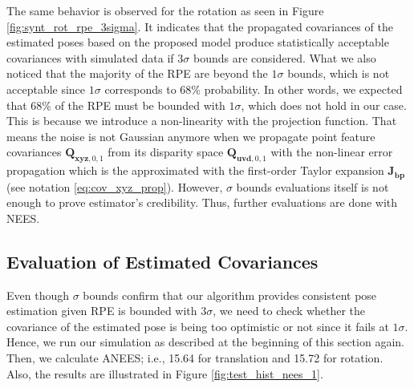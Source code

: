 \documentclass[a4paper]{report}
\numberwithin{figure}{section}
\begin{document}
The same behavior is observed for the rotation as seen in Figure 
\ref{fig:synt_rot_rpe_3sigma}. It indicates that the propagated covariances of 
the estimated poses based on the proposed model produce statistically 
acceptable covariances with simulated data if $3\sigma$ bounds are 
considered.  What we also noticed that the majority of the RPE are beyond the 
$1\sigma$ bounds, which is not acceptable since $1\sigma$ corresponds to 68\% 
probability.  In other words, we expected that 68\% of the RPE must be bounded 
with $1\sigma$, which does not hold in our case. This is because we introduce 
a non-linearity with the projection function. That means the noise is not 
Gaussian anymore when we propagate point feature covariances 
$\mathbf{Q}_{\mathbf{xyz},0,1}$ from its disparity space 
$\mathbf{Q}_{\mathbf{uvd},0,1}$ with the non-linear error propagation which is 
the approximated with the first-order Taylor expansion $\mathbf{J_{bp}}$ (see 
notation \eqref{eq:cov_xyz_prop}).  However, $\sigma$ bounds evaluations 
itself is not enough to prove estimator's credibility. Thus, further 
evaluations are done with NEES.

\subsection{Evaluation of Estimated Covariances}

Even though $\sigma$ bounds confirm that our algorithm provides consistent 
pose estimation given RPE is bounded with $3\sigma$, we need to check whether 
the covariance of the estimated pose is being too optimistic or not since it 
fails at $1\sigma$.  Hence, we run our simulation as described at the 
beginning of this section again.  Then, we calculate ANEES; i.e., 15.64 for 
translation and 15.72 for rotation.  Also, the results are illustrated in 
Figure \ref{fig:test_hist_nees_1}.
\end{document}
